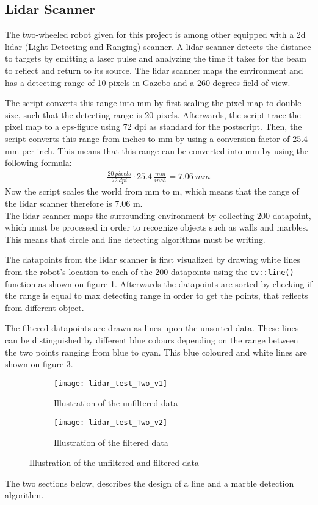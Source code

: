 \documentclass[../Head/Main.tex]{subfiles}
\begin{document}
\subsection{Lidar Scanner}
The two-wheeled robot given for this project is among other equipped with a 2d lidar (Light Detecting and Ranging) scanner. A lidar scanner detects the distance to targets by emitting a laser pulse and analyzing the time it takes for the beam to reflect and return to its source. The lidar scanner maps the environment and has a detecting range of 10 pixels in Gazebo and a 260 degrees field of view. \par
The script converts this range into mm by first scaling the pixel map to double size, such that the detecting range is 20 pixels. Afterwards, the script trace the pixel map to a eps-figure using 72 dpi as standard 
for the postscript. Then, the script converts this range from inches to mm by using a conversion factor of 25.4 mm per inch. This means that this range can be converted into mm by using the following formula:
\begin{align*}
\frac{20~pixels}{72~dpi}\cdot 25.4~\frac{mm}{inch} = 7.06~mm
\end{align*}
Now the script scales the world from mm to m, which means that the range of the lidar scanner therefore is 7.06 m.\\
The lidar scanner maps the surrounding environment by collecting 200 datapoint, which must be processed in order to recognize objects such as walls and marbles. This means that circle and line detecting algorithms must be writing. \par
The datapoints from the lidar scanner is first visualized by drawing white lines from the robot’s location to each of the 200 datapoints using the \texttt{cv::line()} function as shown on figure \ref{fig:white_lines}. Afterwards the datapoints are sorted by checking if the range is equal to max detecting range in order to get the points, that reflects from different object.\par
The filtered datapoints are drawn as lines upon the unsorted data. These lines can be distinguished by different blue colours depending on the range between the two points ranging from blue to cyan. This blue coloured and white lines are shown on figure \ref{fig:blue_lines}.

\begin{figure}[H]
  \begin{subfigure}[b]{0.49\textwidth}
    \centering
    \texttt{[image: lidar\_test\_Two\_v1]}
    \caption{Illustration of the unfiltered data}
    \label{fig:white_lines}
  \end{subfigure}
  \hfill
  \begin{subfigure}[b]{0.49\textwidth}
  	\centering
    \texttt{[image: lidar\_test\_Two\_v2]}
    \caption{Illustration of the filtered data}
    \label{fig:blue_lines}
  \end{subfigure}
  \caption{Illustration of the unfiltered and filtered data}
\end{figure}
The two sections below, describes the design of a line and a marble detection algorithm.


\end{document}
